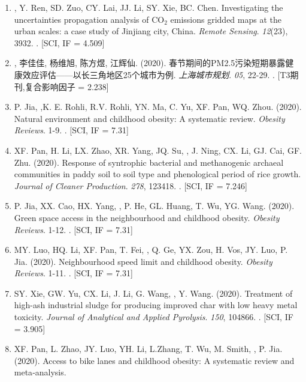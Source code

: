 \begin{enumerate}
\item
    \Shaoqing\CF, Y. Ren, SD. Zuo, CY. Lai, JJ. Li, SY. Xie, BC. Chen.
    Investigating the uncertainties propagation analysis of CO$_2$ emissions gridded maps at the urban scales: a case study of Jinjiang city, China. 
    \textit{Remote Sensing}. \textit{12}(23), 3932.
    . [SCI, IF = 4.509]
\item
    {}, 李佳佳, 杨维旭, 陈方煜, 江辉仙. (2020).
    春节期间的PM2.5污染短期暴露健康效应评估——以长三角地区25个城市为例.
    \textit{上海城市规划}. \textit{05}, 22-29.
    . [T3期刊,复合影响因子 = 2.238] 
\item
    P. Jia, \Shaoqing,K. E. Rohli, R.V. Rohli, YN. Ma, C. Yu, XF. Pan, WQ. Zhou. (2020).
    Natural environment and childhood obesity: A systematic review.
    \textit{Obesity Reviews}. 1-9.
    . [SCI, IF = 7.31]
\item
    XF. Pan, H. Li, LX. Zhao, XR. Yang, JQ. Su, \Shaoqing, J. Ning, CX. Li, GJ. Cai, GF. Zhu. (2020).
    Response of syntrophic bacterial and methanogenic archaeal communities in paddy soil to soil type and phenological period of rice growth.
    \textit{Journal of Cleaner Production}. \textit{278}, 123418.
    . [SCI, IF = 7.246]
\item
    P. Jia, XX. Cao, HX. Yang, \Shaoqing, P. He, GL. Huang, T. Wu, YG. Wang. (2020).
    Green space access in the neighbourhood and childhood obesity.
    \textit{Obesity Reviews}. 1-12.
    . [SCI, IF = 7.31]
\item
    MY. Luo, HQ. Li, XF. Pan, T. Fei, \Shaoqing, Q. Ge, YX. Zou, H. Vos, JY. Luo, P. Jia. (2020).
    Neighbourhood speed limit and childhood obesity.
    \textit{Obesity Reviews}. 1-11.
    . [SCI, IF = 7.31]
\item
    SY. Xie, GW. Yu, CX. Li, J. Li, G. Wang, \Shaoqing, Y. Wang. (2020).
    Treatment of high-ash industrial sludge for producing improved char with low heavy metal toxicity.
    \textit{Journal of Analytical and Applied Pyrolysis}. \textit{150}, 104866.
    . [SCI, IF = 3.905]
\item
    XF. Pan, L. Zhao, JY. Luo, YH. Li, L.Zhang, T. Wu, M. Smith, \Shaoqing, P. Jia. (2020).
    Access to bike lanes and childhood obesity: A systematic review and meta‐analysis.

\end{enumerate}
